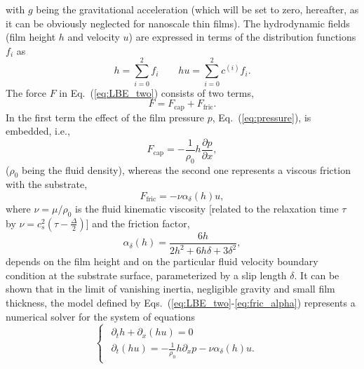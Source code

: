 with $g$ being the gravitational acceleration (which will be set to zero, hereafter, as it can be obviously neglected for nanoscale thin films).
The hydrodynamic fields (film height $h$ and velocity $u$) are expressed in terms of the distribution functions $f_i$ as
\begin{equation}\label{eq:hydrofields}
h= \sum_{i=0}^2 f_i \qquad hu = \sum_{i=0}^2 c^{(i)} f_i.
\end{equation}
The force $F$ in Eq.~(\ref{eq:LBE_two}) consists of two terms,
\begin{equation}\label{eq:force_two}
F = F_{\text{cap}} + F_{\text{fric}}.  
\end{equation}
In the first term the effect of the film pressure $p$, Eq.~(\ref{eq:pressure}), is embedded, i.e., 
\begin{equation}\label{eq:capillary_force}
    F_{\text{cap}} = -\frac{1}{\rho_0} h \frac{\partial p}{\partial x},
\end{equation}
($\rho_0$ being the fluid density), whereas the second one represents a viscous friction with the substrate,
\begin{equation}\label{eq:fric_force}
    F_{\text{fric}} = -\nu \alpha_{\delta}(h) u,
\end{equation}
where $\nu=\mu/\rho_0$ is the fluid kinematic viscosity [related to the relaxation time $\tau$ by $\nu = c_s^2\left(\tau-\frac{\Delta}{2}\right)$] and the friction factor,
\begin{equation}\label{eq:fric_alpha}
     \alpha_{\delta}(h) = \frac{6 h}{2h^2 + 6h\delta + 3\delta^2},
\end{equation}
depends on the film height and on the particular fluid velocity boundary condition at the substrate surface, parameterized by a slip length $\delta$.
It can be shown that in the limit of vanishing inertia, negligible gravity and small film thickness, the model defined by Eqs.~(\ref{eq:LBE_two}-\ref{eq:fric_alpha}) represents a numerical solver for the system of equations
\begin{equation}\label{eq:lubr2eq}
  \begin{cases}
    \begin{array}{ll}
      \partial_t h + \partial_x (h u)  = 0 & \\ 
      \partial_t (h u) = -\frac{1}{\rho_0}h\partial_x p -\nu\alpha_{\delta}(h)u.
    \end{array}
  \end{cases}
\end{equation}

